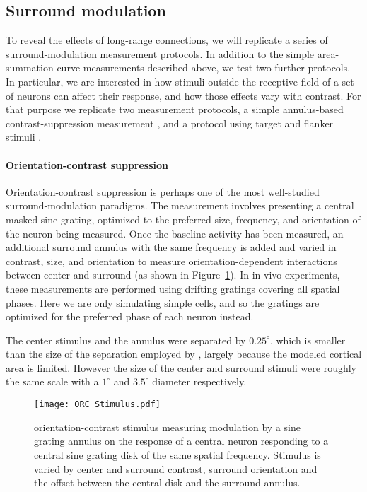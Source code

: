 \subsection{Surround modulation}

To reveal the effects of long-range connections, we will replicate a
series of surround-modulation measurement protocols. In addition to
the simple area-summation-curve measurements described above, we test
two further protocols.  In particular, we are interested in how
stimuli outside the receptive field of a set of neurons can affect
their response, and how those effects vary with contrast. For that
purpose we replicate two measurement protocols, a simple annulus-based
contrast-suppression measurement \citep{Jones2002}, and a protocol
using target and flanker stimuli \citep{Kapadia1995}.

\paragraph{Orientation-contrast suppression}

Orientation-contrast suppression is perhaps one of the most
well-studied surround-modulation paradigms. The measurement involves
presenting a central masked sine grating, optimized to the preferred
size, frequency, and orientation of the neuron being measured. Once
the baseline activity has been measured, an additional surround
annulus with the same frequency is added and varied in contrast, size,
and orientation to measure orientation-dependent interactions between
center and surround (as shown in Figure~\ref{ORC_Stimulus}). In
in-vivo experiments, these measurements are performed using drifting
gratings covering all spatial phases.  Here we are only simulating
simple cells, and so the gratings are optimized for the preferred
phase of each neuron instead.

The center stimulus and the annulus were separated by $0.25^\circ$,
which is smaller than the size of the separation employed by
\cite{Jones2002}, largely because the modeled cortical area is
limited. However the size of the center and surround stimuli were
roughly the same scale with a $1^\circ$ and $3.5^\circ$ diameter
respectively.

\begin{figure}
	\centering
        \texttt{[image: ORC\_Stimulus.pdf]}
	\caption{orientation-contrast stimulus measuring modulation by a
      sine grating annulus on the response of a central neuron
      responding to a central sine grating disk of the same spatial frequency.
      Stimulus is varied by center and surround contrast, surround
      orientation and the offset between the central disk and the
      surround annulus.}
	\label{ORC_Stimulus}
\end{figure}

